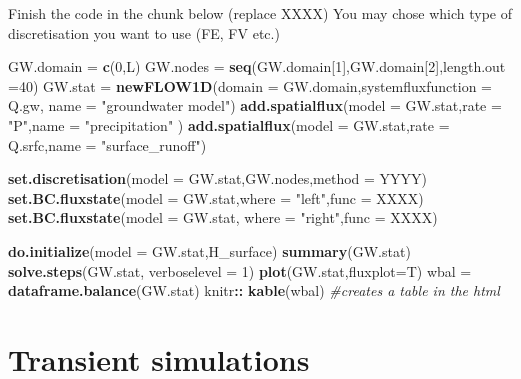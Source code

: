 \documentclass[
]{article}
\newenvironment{Shaded}{\begin{snugshade}}{\end{snugshade}}
\newcommand{\AttributeTok}[1]{\textcolor[rgb]{0.13,0.29,0.53}{#1}}
\newcommand{\CommentTok}[1]{\textcolor[rgb]{0.56,0.35,0.01}{\textit{#1}}}
\newcommand{\DecValTok}[1]{\textcolor[rgb]{0.00,0.00,0.81}{#1}}
\newcommand{\FunctionTok}[1]{\textcolor[rgb]{0.13,0.29,0.53}{\textbf{#1}}}
\newcommand{\NormalTok}[1]{#1}
\newcommand{\OtherTok}[1]{\textcolor[rgb]{0.56,0.35,0.01}{#1}}
\newcommand{\SpecialCharTok}[1]{\textcolor[rgb]{0.81,0.36,0.00}{\textbf{#1}}}
\newcommand{\StringTok}[1]{\textcolor[rgb]{0.31,0.60,0.02}{#1}}
\begin{document}
Finish the code in the chunk below (replace XXXX) You may chose which
type of discretisation you want to use (FE, FV etc.)

\begin{Shaded}
\begin{Highlighting}[]
\NormalTok{GW.domain }\OtherTok{=} \FunctionTok{c}\NormalTok{(}\DecValTok{0}\NormalTok{,L)}
\NormalTok{GW.nodes }\OtherTok{=} \FunctionTok{seq}\NormalTok{(GW.domain[}\DecValTok{1}\NormalTok{],GW.domain[}\DecValTok{2}\NormalTok{],}\AttributeTok{length.out =}\DecValTok{40}\NormalTok{)}
\NormalTok{GW.stat }\OtherTok{=} \FunctionTok{newFLOW1D}\NormalTok{(}\AttributeTok{domain =}\NormalTok{ GW.domain,}\AttributeTok{systemfluxfunction =}\NormalTok{ Q.gw, }\AttributeTok{name =} \StringTok{"groundwater model"}\NormalTok{)}
\FunctionTok{add.spatialflux}\NormalTok{(}\AttributeTok{model =}\NormalTok{ GW.stat,}\AttributeTok{rate =} \StringTok{"P"}\NormalTok{,}\AttributeTok{name =} \StringTok{"precipitation"}\NormalTok{ )}
\FunctionTok{add.spatialflux}\NormalTok{(}\AttributeTok{model =}\NormalTok{ GW.stat,}\AttributeTok{rate =}\NormalTok{ Q.srfc,}\AttributeTok{name =} \StringTok{"surface\_runoff"}\NormalTok{)}

\FunctionTok{set.discretisation}\NormalTok{(}\AttributeTok{model =}\NormalTok{ GW.stat,GW.nodes,}\AttributeTok{method =}\NormalTok{ YYYY)}
\FunctionTok{set.BC.fluxstate}\NormalTok{(}\AttributeTok{model =}\NormalTok{ GW.stat,}\AttributeTok{where =} \StringTok{"left"}\NormalTok{,}\AttributeTok{func =}\NormalTok{ XXXX)}
\FunctionTok{set.BC.fluxstate}\NormalTok{(}\AttributeTok{model =}\NormalTok{ GW.stat, }\AttributeTok{where =} \StringTok{"right"}\NormalTok{,}\AttributeTok{func =}\NormalTok{ XXXX)}

\FunctionTok{do.initialize}\NormalTok{(}\AttributeTok{model =}\NormalTok{ GW.stat,H\_surface)}
\FunctionTok{summary}\NormalTok{(GW.stat)}
\FunctionTok{solve.steps}\NormalTok{(GW.stat, }\AttributeTok{verboselevel =} \DecValTok{1}\NormalTok{)}
\FunctionTok{plot}\NormalTok{(GW.stat,}\AttributeTok{fluxplot=}\NormalTok{T)}
\NormalTok{wbal }\OtherTok{=} \FunctionTok{dataframe.balance}\NormalTok{(GW.stat)}
\NormalTok{knitr}\SpecialCharTok{::} \FunctionTok{kable}\NormalTok{(wbal) }\CommentTok{\#creates a table in the html}
\end{Highlighting}
\end{Shaded}

\hypertarget{transient-simulations}{%
\section{Transient simulations}\label{transient-simulations}}
\end{document}
